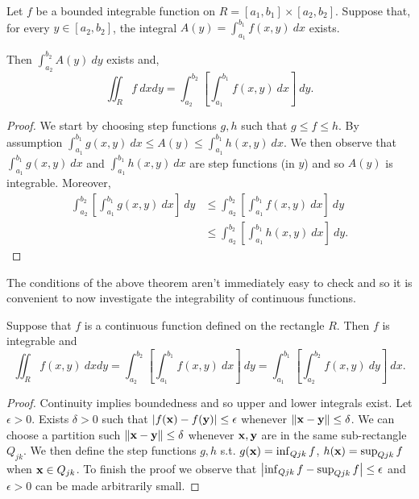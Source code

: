 \begin{theorem*}
    Let \(f\) be a bounded integrable function on  \(R = [a_1,b_1] \times [a_2,b_2]\).
    Suppose that, for every \(y\in [a_2,b_2]\), the integral \( A(y) = \int_{a_1}^{b_1} f(x,y) \ dx \) exists.

    Then \(\int_{a_2}^{b_2} A(y) \ dy\) exists and,
    \[
        \iint_{R} f \ dxdy = \int_{a_2}^{b_2} \left[ \int_{a_1}^{b_1} f(x,y) \ dx  \right] \ dy.
    \]
\end{theorem*}

\begin{proof}
    We start by choosing step functions \(g,h\) such that \(g\leq f \leq h\).
    By assumption \(\int_{a_1}^{b_1} g(x,y) \ dx \leq A(y) \leq \int_{a_1}^{b_1} h(x,y) \ dx\).
    We then observe that \(\int_{a_1}^{b_1} g(x,y) \ dx \) and \(\int_{a_1}^{b_1} h(x,y) \ dx\) are step functions (in \(y\)) and so \(A(y)\) is integrable.
    Moreover,
    \[
        \begin{aligned}
            \int_{a_2}^{b_2} \left[ \int_{a_1}^{b_1} g(x,y) \ dx  \right] \ dy
             & \leq \int_{a_2}^{b_2} \left[ \int_{a_1}^{b_1} f(x,y) \ dx  \right] \ dy  \\
             & \leq \int_{a_2}^{b_2} \left[ \int_{a_1}^{b_1} h(x,y) \ dx  \right] \ dy.
        \end{aligned}
    \]
\end{proof}

The conditions of the above theorem aren't immediately easy to check and so it is convenient to now investigate the integrability of continuous functions.

\begin{theorem}
    Suppose that \(f\) is a continuous function defined on the rectangle \(R\).
    Then \(f\) is integrable and
    \[
        \iint_{R} f(x,y) \ dxdy
        = \int_{a_2}^{b_2} \left[ \int_{a_1}^{b_1} f(x,y) \ dx  \right] \ dy
        = \int_{a_1}^{b_1} \left[\int_{a_2}^{b_2}  f(x,y) \ dy  \right] \ dx.
    \]
\end{theorem}
\begin{proof}
    Continuity implies boundedness and so upper and lower integrals exist.
    Let \(\epsilon>0\). Exists \(\delta>0\) such that \(\left|f(\mathbf{x})-f(\mathbf{y})\right|\leq \epsilon\) whenever \(\left\|\mathbf{x}-\mathbf{y}\right\|\leq \delta\).
    We can choose a partition such  \(\left\|\mathbf{x}-\mathbf{y}\right\|\leq \delta\) whenever \(\mathbf{x},\mathbf{y}\) are in the same sub-rectangle \(Q_{jk}\).
    We then define the step functions \(g,h\) s.t. \(g(\mathbf{x})=\inf_{Q{jk}} f\),   \(h(\mathbf{x})=\sup_{Q{jk}} f\) when \(\mathbf{x}\in Q_{jk}\).
    To finish the proof we observe that \(\left|\inf_{Q{jk}} f - \sup_{Q{jk}} f \right|\leq \epsilon\) and \(\epsilon>0\) can be made arbitrarily small.
\end{proof}

